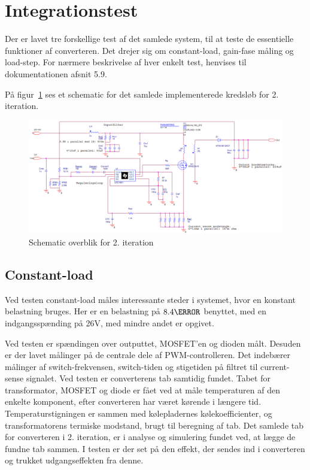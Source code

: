 

\section{Integrationstest} \label{Integrationstest}
Der er lavet tre forskellige test af det samlede system, til at teste de essentielle funktioner af converteren. Det drejer sig om constant-load, gain-fase måling og load-step. For nærmere beskrivelse af hver enkelt test, henvises til dokumentationen afsnit 5.9.

På figur~\ref{fig:sche2iteration} ses et schematic for det samlede implementerede kredsløb for 2. iteration.
\begin{figure}[H]
	\center
	\includegraphics[max width=1.1\linewidth]{../dokumentation/tex/2iteration/billeder/Schemaricoverview_2iteration.PNG}
	\caption{Schematic overblik for 2. iteration}
	\label{fig:sche2iteration}
\end{figure}

\subsection{Constant-load}
Ved testen constant-load måles interessante steder i systemet, hvor en konstant belastning bruges. Her er en belastning på $8.4\ohm$ benyttet, med en indgangsspænding på 26V, med mindre andet er opgivet.

Ved testen er spændingen over outputtet, MOSFET'en og dioden målt. Desuden er der lavet målinger på de centrale dele af PWM-controlleren. Det indebærer målinger af switch-frekvensen, switch-tiden og stigetiden på filtret til current-sense signalet.  
Ved testen er converterens tab samtidig fundet. Tabet for transformator, MOSFET og diode er fået ved at måle temperaturen af den enkelte komponent, efter converteren har været kørende i længere tid. Temperaturstigningen er sammen med kølepladernes kølekoefficienter, og transformatorens termiske modstand, brugt til beregning af tab. Det samlede tab for converteren i 2. iteration, er i analyse og simulering fundet ved, at lægge de fundne tab sammen. I testen er der set på den effekt, der sendes ind i converteren og trukket udgangseffekten fra denne.


